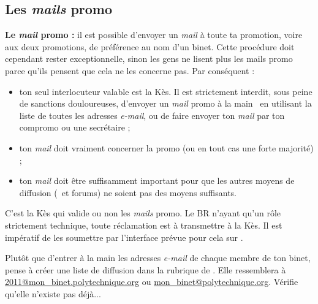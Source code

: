 \subsection{Les \emph{mails} promo}

\label{mails_promo}


\textbf{Le \emph{mail} promo :} il est possible d'envoyer un \emph{mail} \`a toute
ta promotion, voire aux deux promotions, de pr\'ef\'erence au nom d'un binet.
Cette proc\'edure doit cependant rester exceptionnelle, sinon les gens ne lisent plus les
mails promo parce qu'ils pensent que cela ne les concerne pas. Par
cons\'equent :
\begin{itemize}
  \item ton seul interlocuteur valable est la K\`es. Il est strictement interdit, sous peine de sanctions douloureuses, d'envoyer un \emph{mail} promo \og \`a la main \fg~en utilisant la liste de toutes les adresses \emph{e-mail},
  ou de faire envoyer ton \emph{mail} par ton compromo ou une secr\'etaire ;
  \item ton \emph{mail} doit vraiment concerner la promo (ou en tout cas une forte majorit\'e) ;
  \item ton \emph{mail} doit \^etre suffisamment important pour que les autres moyens de diffusion (\fkz\ et forums) ne soient pas des moyens suffisants.
\end{itemize}
C'est la K\`es qui valide ou non les \emph{mails} promo. Le BR n'ayant qu'un r\^ole strictement technique, toute r\'eclamation est \`a transmettre \`a la K\`es. Il est
imp\'eratif de les soumettre par l'interface pr\'evue pour cela sur \fkz.

Plut\^ot que d'entrer \`a la main les adresses \emph{e-mail} de chaque membre de ton binet, pense \`a cr\'eer une liste de diffusion dans la rubrique  de .
Elle ressemblera \`a \url{2011@mon_binet.polytechnique.org} ou \url{mon_binet@polytechnique.org}. V\'erifie qu'elle n'existe pas d\'ej\`a...
